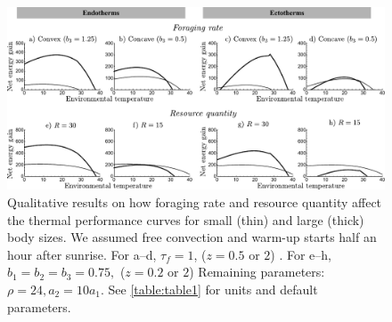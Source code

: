 \begin{figure}
\includegraphics[width=\textwidth]{fig5}
\caption{
    \setstretch{\stretchby}
	Qualitative results on how foraging rate and resource quantity affect the thermal performance curves for small (thin) and large (thick) body sizes.
  We assumed free convection and warm-up starts half an hour after sunrise.
  For a--d, $\tau_f = 1$, ($z = 0.5 \mbox{ or } 2$) .
	For e--h, $b_1 = b_2 = b_3 = 0.75,$ ($z = 0.2 \mbox{ or } 2$)
	Remaining parameters: $\rho = 24, a_2 = 10 a_1$.
	See \cref{table:table1} for units and default parameters.
}
\label{fig5}
\end{figure}

